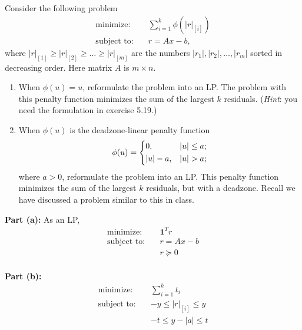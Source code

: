 \documentclass[11pt]{article}
\begin{document}
\begin{homeworkProblem}

    Consider the following problem
    \begin{align*}
        \text{minimize:} \quad   & \sum_{i=1}^k \phi(|r|_{[i]}) \\
        \text{subject to:} \quad & r = Ax - b,
    \end{align*}
    where $|r|_{[1]} \geq |r|_{[2]} \geq \ldots \geq |r|_{[m]}$ are the numbers $|r_1|, |r_2|, \ldots, |r_m|$ sorted in decreasing order. Here matrix $A$ is $m\times n$.
    \begin{enumerate}[label=(\alph*), topsep=5pt, itemsep=5pt]
        \item When $\phi(u)=u$, reformulate the problem into an LP. The problem with this penalty function minimizes the sum of the largest $k$ residuals. (\textit{Hint}: you need the formulation in exercise 5.19.)
        \item When $\phi(u)$ is the deadzone-linear penalty function
              \[
                  \phi(u) = \begin{dcases}
                      0,       & |u| \leq a; \\
                      |u| - a, & |u| > a;    \\
                  \end{dcases}
              \]
              where $a > 0$, reformulate the problem into an LP. This penalty function minimizes the
              sum of the largest $k$ residuals, but with a deadzone. Recall we have discussed a problem
              similar to this in class. \newline
    \end{enumerate}

    \solution

    \textbf{Part (a):} As an LP,
    \begin{align*}
        \text{minimize:} \quad   & \mathbf{1}^T r \\
        \text{subject to:} \quad & r = Ax - b     \\
                                 & r \succeq 0    \\
    \end{align*}

    \textbf{Part (b):}
    \begin{align*}
        \text{minimize:} \quad   & \sum_{i=1}^{k} t_i       \\
        \text{subject to:} \quad & -y \leq |r|_{[i]} \leq y \\
                                 & -t \leq y - |a| \leq t
    \end{align*}

\end{homeworkProblem}
\end{document}
